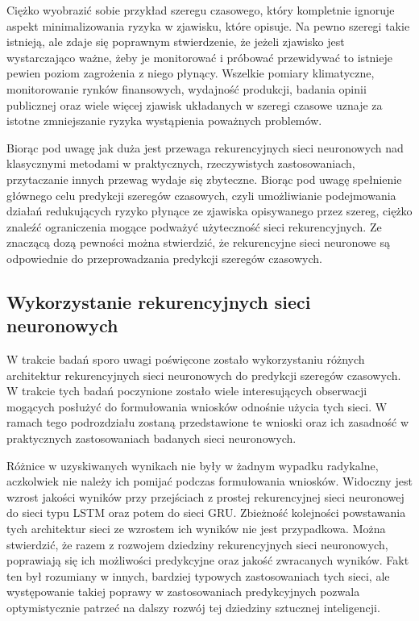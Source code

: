 \documentclass[10pt,a4paper]{article}
\begin{document}
Ciężko wyobrazić sobie przykład szeregu czasowego, który kompletnie ignoruje aspekt minimalizowania ryzyka w zjawisku, które opisuje. Na pewno szeregi takie istnieją, ale zdaje się poprawnym stwierdzenie, że jeżeli zjawisko jest wystarczająco ważne, żeby je monitorować i próbować przewidywać to istnieje pewien poziom zagrożenia z niego płynący. Wszelkie pomiary klimatyczne, monitorowanie rynków finansowych, wydajność produkcji, badania opinii publicznej oraz wiele więcej zjawisk układanych w szeregi czasowe uznaje za istotne zmniejszanie ryzyka wystąpienia poważnych problemów. 

Biorąc pod uwagę jak duża jest przewaga rekurencyjnych sieci neuronowych nad klasycznymi metodami w praktycznych, rzeczywistych zastosowaniach, przytaczanie innych przewag wydaje się zbyteczne. Biorąc pod uwagę spełnienie głównego celu predykcji szeregów czasowych, czyli umożliwianie podejmowania działań redukujących ryzyko płynące ze zjawiska opisywanego przez szereg, ciężko znaleźć ograniczenia mogące podważyć użyteczność sieci rekurencyjnych. Ze znaczącą dozą pewności można stwierdzić, że rekurencyjne sieci neuronowe są odpowiednie do przeprowadzania predykcji szeregów czasowych.

\subsection{Wykorzystanie rekurencyjnych sieci neuronowych}
\label{subsection:conclusions:usage}
W trakcie badań sporo uwagi poświęcone zostało wykorzystaniu różnych architektur rekurencyjnych sieci neuronowych do predykcji szeregów czasowych. W trakcie tych badań poczynione zostało wiele interesujących obserwacji mogących posłużyć do formułowania wniosków odnośnie użycia tych sieci. W ramach tego podrozdziału zostaną przedstawione te wnioski oraz ich zasadność w praktycznych zastosowaniach badanych sieci neuronowych. 

Różnice w uzyskiwanych wynikach nie były w żadnym wypadku radykalne, aczkolwiek nie należy ich pomijać podczas formułowania wniosków. Widoczny jest wzrost jakości wyników przy przejściach z prostej rekurencyjnej sieci neuronowej do sieci typu LSTM oraz potem do sieci GRU. Zbieżność kolejności powstawania tych architektur sieci ze wzrostem ich wyników nie jest przypadkowa. Można stwierdzić, że razem z rozwojem dziedziny rekurencyjnych sieci neuronowych, poprawiają się ich możliwości predykcyjne oraz jakość zwracanych wyników. Fakt ten był rozumiany w innych, bardziej typowych zastosowaniach tych sieci, ale występowanie takiej poprawy w zastosowaniach predykcyjnych pozwala optymistycznie patrzeć na dalszy rozwój tej dziedziny sztucznej inteligencji. 
\end{document}
